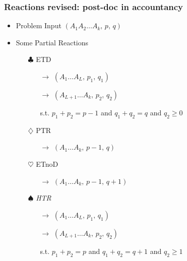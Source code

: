 \documentclass[xetex]{beamer}
\begin{document}
	\begin{frame}\frametitle{Reactions revised: post-doc in accountancy}
		
		\begin{itemize}
			\item Problem Input $(A_1 A_2 \dots A_k,\, p ,\, q)$ 
			\item Some Partial Reactions
				\begin{itemize}
				\item[$\clubsuit$] ETD
				\begin{itemize}
					\item[$\rightarrow$] $ (A_1 \dots A_L,\, p_1,\, q_1) $
					\item[$\rightarrow$] $ (A_{L+1} \dots A_k,\, p_2,\, q_2) $
					\item[s.t.]$p_1 + p_2 = p -1$ and $q_1 + q_2 = q$ and $q_2 \geq 0$
				\end{itemize}
				\item[$\diamondsuit$] PTR 
				\begin{itemize}
					\item[$\rightarrow$] $ (A_1 \dots A_k,\, p-1,\, q)$ 
				\end{itemize}
				\item[$\heartsuit$] ETnoD 
				\begin{itemize}
					\item[$\rightarrow$] $ (A_1 \dots A_k,\, p-1,\, q+1)$ 
				\end{itemize}
				\item[$\spadesuit$] \emph{HTR}
				\begin{itemize}
					\item[$\rightarrow$] $ (A_1 \dots A_L,\, p_1,\, q_1)$ 
					\item[$\rightarrow$] $ (A_{L+1} \dots A_k,\, p_2,\, q_2)$ 
					\item[s.t.] $p_1 + p_2 = p$ and $q_1 + q_2 = q + 1$ and $q_2 \geq 1$
				\end{itemize}	
			\end{itemize}
		\end{itemize}
	\end{frame}
\end{document}
